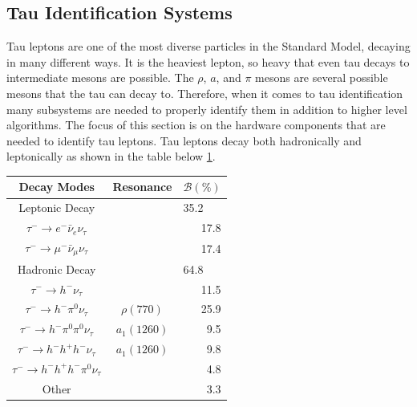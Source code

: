 

\subsection{Tau Identification Systems}
Tau leptons are one of the most diverse particles in the Standard Model, decaying in many different ways. It is the heaviest lepton, so heavy that even tau decays to intermediate mesons are possible. The $\rho$, $a$, and $\pi$ mesons are several possible mesons that the tau can decay to. Therefore, when it comes to tau identification many subsystems are needed to properly identify them in addition to higher level algorithms. The focus of this section is on the hardware components that are needed to identify tau leptons. Tau leptons decay both hadronically and leptonically as shown in the table below \ref{tab:taudecay}. 



\begin{table}[h!tbp]
\centering
\label{tab:taudecay}
\begin{tabular}{c  c r}
Decay Modes & Resonance & \multicolumn{1}{c}{$\mathcal{B}(\%)$} \\\hline
Leptonic Decay && \multicolumn{1}{l}{35.2}\\
$\tau^- \rightarrow e^- \bar{\nu}_e \nu_\tau $ & & 17.8 \\
$\tau^- \rightarrow \mu^- \bar{\nu}_\mu \nu_\tau$ & & 17.4 \\\hline
Hadronic Decay && \multicolumn{1}{l}{64.8}\\
$\tau^- \rightarrow h^-\nu_\tau$ & & 11.5 \\
$\tau^- \rightarrow h^-\pi^0 \nu_\tau$ & $\rho(770)$ & 25.9 \\
$\tau^- \rightarrow h^-\pi^0 \pi^0 \nu_\tau$ & $a_1(1260)$ & 9.5 \\
$\tau^- \rightarrow h^- h^+ h^- \nu_\tau$ & $a_1(1260)$ & 9.8 \\
$\tau^- \rightarrow h^- h^+ h^- \pi^0 \nu_\tau$ & & 4.8 \\
Other & & 3.3 \\\hline
\end{tabular}
\end{table}

